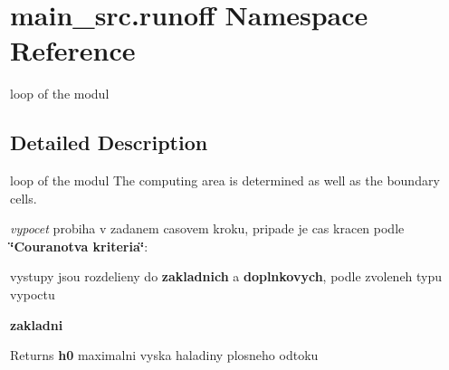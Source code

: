 \hypertarget{namespacemain__src_1_1runoff}{\section{main\-\_\-src.\-runoff Namespace Reference}
\label{namespacemain__src_1_1runoff}
}


loop of the modul  




\subsection{Detailed Description}
loop of the modul The computing area is determined as well as the boundary cells.

{\itshape vypocet} probiha v zadanem casovem kroku, pripade je cas kracen podle {\bfseries \char`\"{}\-Couranotva kriteria\char`\"{}}\-:
\begin{DoxyItemize}
\item vystupy jsou rozdelieny do {\bfseries zakladnich} a {\bfseries doplnkovych}, podle zvoleneh typu vypoctu
\item {\bfseries zakladni} 
\begin{DoxyItemize}
\item \begin{DoxyReturn}{Returns}
{\bfseries h0} maximalni vyska haladiny plosneho odtoku 
\end{DoxyReturn}

\end{DoxyItemize}
\end{DoxyItemize}